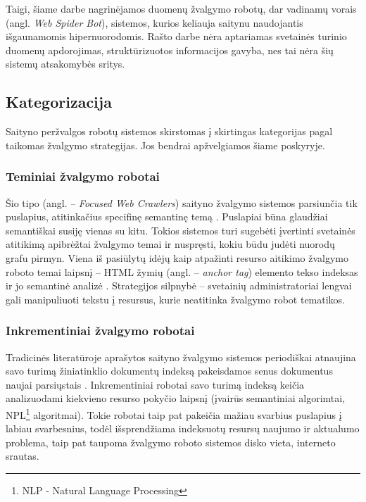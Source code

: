 Taigi, šiame darbe nagrinėjamos duomenų žvalgymo robotų, dar vadinamų vorais (angl. \textit{Web Spider Bot}), sistemos, kurios keliauja saitynu naudojantis išgaunamomis hipernuorodomis. Rašto darbe nėra aptariamas svetainės turinio duomenų apdorojimas, struktūrizuotos informacijos gavyba, nes tai nėra šių sistemų atsakomybės sritys.



\subsection{Kategorizacija}

Saityno peržvalgos robotų sistemos skirstomas į skirtingas kategorijas pagal taikomas žvalgymo strategijas. Jos bendrai apžvelgiamos šiame poskyryje.

\subsubsection{Teminiai žvalgymo robotai}

Šio tipo (angl. -- \textit{Focused Web Crawlers}) saityno žvalgymo sistemos parsiunčia tik puslapius, atitinkačius specifinę semantinę temą \cite{CategoriesOfWebCrawlersAndOverview}. Puslapiai būna glaudžiai semantiškai susiję vienas su kitu. Tokios sistemos turi sugebėti įvertinti svetainės atitikimą apibrėžtai žvalgymo temai ir nuspręsti, kokiu būdu judėti nuorodų grafu pirmyn. Viena iš pasiūlytų idėjų kaip atpažinti resurso aitikimo žvalgymo roboto temai laipsnį -- HTML žymių (angl. -- \textit{anchor tag}) elemento tekso indeksas ir jo semantinė analizė \cite{AnchorTagsSemanticAnalysis}. Strategijos silpnybė -- svetainių administratoriai lengvai gali manipuliuoti tekstu į resursus, kurie neatitinka žvalgymo robot tematikos.


\subsubsection{Inkrementiniai žvalgymo robotai}

Tradicinės literatūroje aprašytos saityno žvalgymo sistemos periodiškai atnaujina savo turimą žiniatinklio dokumentų indeksą pakeisdamos senus dokumentus naujai parsiųstais \cite{CategoriesOfWebCrawlersAndOverview}. Inkrementiniai robotai savo turimą indeksą keičia analizuodami kiekvieno resurso pokyčio laipsnį (įvairūs semantiniai algorimtai, NPL\footnote{NLP - Natural Language Processing} algoritmai). Tokie robotai taip pat pakeičia mažiau svarbius puslapius į labiau svarbesnius, todėl išsprendžiama indeksuotų resursų naujumo ir aktualumo problema, taip pat taupoma žvalgymo roboto sistemos disko vieta, interneto srautas.

